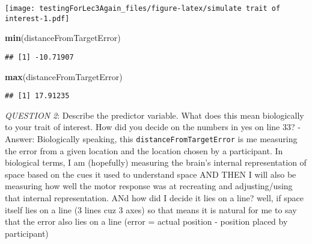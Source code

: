 \documentclass[
]{article}
\newenvironment{Shaded}{\begin{snugshade}}{\end{snugshade}}
\newcommand{\AttributeTok}[1]{\textcolor[rgb]{0.13,0.29,0.53}{#1}}
\newcommand{\ConstantTok}[1]{\textcolor[rgb]{0.56,0.35,0.01}{#1}}
\newcommand{\DecValTok}[1]{\textcolor[rgb]{0.00,0.00,0.81}{#1}}
\newcommand{\DocumentationTok}[1]{\textcolor[rgb]{0.56,0.35,0.01}{\textbf{\textit{#1}}}}
\newcommand{\FloatTok}[1]{\textcolor[rgb]{0.00,0.00,0.81}{#1}}
\newcommand{\FunctionTok}[1]{\textcolor[rgb]{0.13,0.29,0.53}{\textbf{#1}}}
\newcommand{\NormalTok}[1]{#1}
\newcommand{\OtherTok}[1]{\textcolor[rgb]{0.56,0.35,0.01}{#1}}
\newcommand{\SpecialCharTok}[1]{\textcolor[rgb]{0.81,0.36,0.00}{\textbf{#1}}}
\begin{document}
\texttt{[image: testingForLec3Again\_files/figure-latex/simulate trait of interest-1.pdf]}

\begin{Shaded}
\begin{Highlighting}[]
\FunctionTok{min}\NormalTok{(distanceFromTargetError)}
\end{Highlighting}
\end{Shaded}

\begin{verbatim}
## [1] -10.71907
\end{verbatim}

\begin{Shaded}
\begin{Highlighting}[]
\FunctionTok{max}\NormalTok{(distanceFromTargetError)}
\end{Highlighting}
\end{Shaded}

\begin{verbatim}
## [1] 17.91235
\end{verbatim}

\emph{QUESTION 2}: Describe the predictor variable. What does this mean
biologically to your trait of interest. How did you decide on the
numbers in yes on line 33? - Answer: Biologically speaking, this
\texttt{distanceFromTargetError} is me measuring the error from a given
location and the location chosen by a participant. In biological terms,
I am (hopefully) measuring the brain's internal representation of space
based on the cues it used to understand space AND THEN I will also be
measuring how well the motor response was at recreating and
adjusting/using that internal representation. ANd how did I decide it
lies on a line? well, if space itself lies on a line (3 lines cuz 3
axes) so that means it is natural for me to say that the error also lies
on a line (error = actual position - position placed by participant)

\begin{Shaded}
\end{Shaded}
\end{document}
